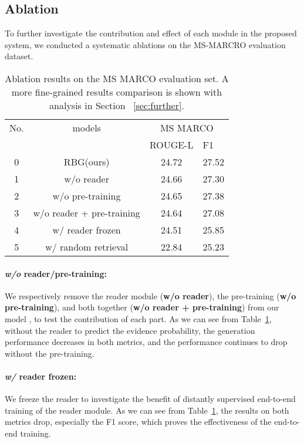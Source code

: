 \documentclass[11pt]{article}
\begin{document}
\vspace{-5pt}
\subsection{Ablation}
\vspace{-3pt}
To further investigate the contribution and effect of each module in the proposed system, we conducted a systematic ablations on the MS-MARCRO evaluation dataset. 

\begin{table}[!th]
\centering
\resizebox{0.45\textwidth}{!}
{
\begin{tabular}{c|c|cc}
\hline
No. & models     & \multicolumn{2}{c}{MS MARCO} \\ 
  &   & ROUGE-L    & \multicolumn{1}{l}{F1} \\ \hline
0 & RBG(ours)    & 24.72 & 27.52                  \\ 
1 & w/o reader &  24.66 & 27.30 \\
2 & w/o pre-training  & 24.65  & 27.38   \\
3 & w/o reader + pre-training & 24.64  & 27.08 \\
4 & w/ reader frozen &  24.51 & 25.85 \\
5 & w/ random retrieval  & 22.84  & 25.23  \\
\hline
\end{tabular}
}
\vspace{-5pt}
\caption{Ablation results on the MS MARCO evaluation set. A more fine-grained results comparison is shown with analysis in Section ~\ref{sec:further}.}
\label{ablation}
\vspace{-15pt}
\end{table}

\vspace{-0.5pt}
\paragraph{\textit{w/o} reader/pre-training:} We respectively remove the reader module (\textbf{w/o reader}), the pre-training (\textbf{w/o pre-training}), and both together (\textbf{w/o reader + pre-training}) from our model , to test the contribution of each part. As we can see from Table~\ref{ablation}, without the reader to predict the evidence probability, the generation performance decreases in both metrics, and the performance continues to drop without the pre-training. 

\vspace{-5pt}
\paragraph{\textit{w/} reader frozen:}  We freeze the reader to investigate the benefit of distantly supervised end-to-end training of the reader module. As we can see from Table~\ref{ablation}, the results on both metrics drop, especially the F1 score, which proves the effectiveness of the end-to-end training.
\vspace{-5pt}
\end{document}
